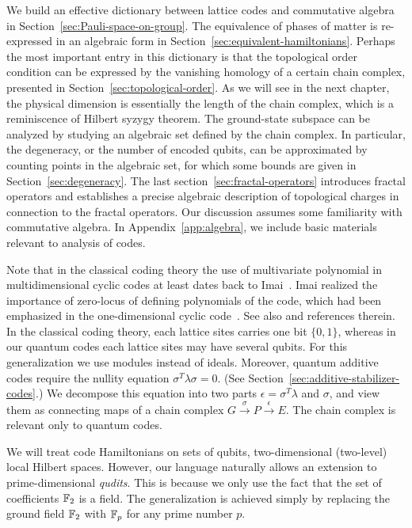 We build an effective dictionary between lattice codes and commutative algebra in Section~\ref{sec:Pauli-space-on-group}.
The equivalence of phases of matter is re-expressed in an algebraic form in Section~\ref{sec:equivalent-hamiltonians}.
Perhaps the most important entry in this dictionary is that
the topological order condition can be expressed by 
the vanishing homology of a certain chain complex, presented in Section~\ref{sec:topological-order}.
As we will see in the next chapter,
the physical dimension is essentially the length of the chain complex,
which is a reminiscence of Hilbert syzygy theorem.
The ground-state subspace can be analyzed by studying an algebraic set defined by the chain complex.
In particular, the degeneracy, or the number of encoded qubits, can be approximated by counting points in the algebraic set,
for which some bounds are given in Section~\ref{sec:degeneracy}.
The last section~\ref{sec:fractal-operators} introduces fractal operators and 
establishes a precise algebraic description of topological charges in connection to the fractal operators.
Our discussion assumes some familiarity with commutative algebra.
In Appendix~\ref{app:algebra}, we include basic materials relevant to analysis of codes.

Note that in the classical coding theory the use of multivariate polynomial 
in multidimensional cyclic codes at least dates back to Imai~\cite{Imai1977TDC}.
Imai realized the importance of zero-locus of defining polynomials of the code,
which had been emphasized in the one-dimensional cyclic code~\cite{MacWilliamsSloane1977}.
See also \cite{SaintsHeegard1995MultidimensionalCyclicCodes,GueneriOezbudak2008} and references therein.
In the classical coding theory,
each lattice sites carries one bit $\{0,1\}$,
whereas in our quantum codes each lattice sites may have several qubits.
For this generalization	 we use modules instead of ideals.
Moreover, quantum additive codes require the nullity equation
$ \sigma^T \lambda \sigma = 0$.
(See Section~\ref{sec:additive-stabilizer-codes}.)
We decompose this equation into two parts $\epsilon = \sigma^T\lambda$ and $\sigma$,
and view them as connecting maps of a chain complex
$ G \xrightarrow{\sigma} P \xrightarrow{\epsilon} E $.
The chain complex is relevant only to quantum codes.

We will treat code Hamiltonians on sets of qubits, two-dimensional (two-level) local Hilbert spaces.
However, our language naturally allows an extension to prime-dimensional \emph{qudits}.
This is because we only use the fact that the set of coefficients $\mathbb{F}_2$ is a field.
The generalization is achieved simply by replacing the ground field $\mathbb{F}_2$ 
with $\mathbb{F}_p$ for any prime number $p$.

